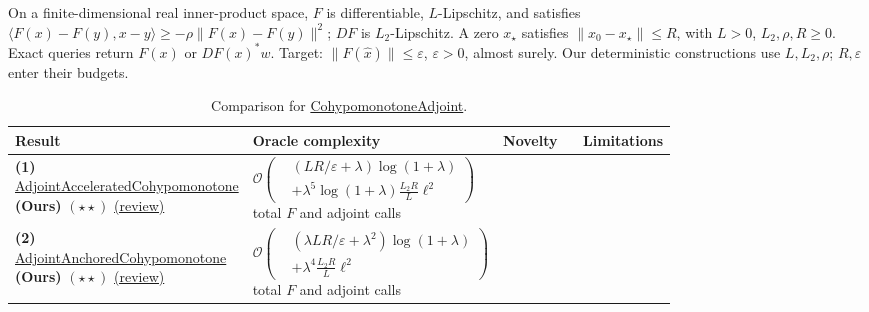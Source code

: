 \begin{table}[tp]
\centering
\caption{Comparison for \href{https://github.com/k3nfalt/longtails/blob/main/LongTails/Setups/CohypomonotoneAdjoint.lean}{CohypomonotoneAdjoint}.}\label{tab:CohypomonotoneAdjoint}
\parbox{\linewidth}{\footnotesize On a finite-dimensional real inner-product space, $F$ is differentiable, $L$-Lipschitz, and satisfies $\langle F(x)-F(y),x-y\rangle\geq-\rho\|F(x)-F(y)\|^2$; $DF$ is $L_2$-Lipschitz. A zero $x_\star$ satisfies $\|x_0-x_\star\|\leq R$, with $L>0$, $L_2,\rho,R\geq0$. Exact queries return $F(x)$ or $DF(x)^*w$. Target: $\|F(\widehat x)\|\leq\varepsilon$, $\varepsilon>0$, almost surely. Our deterministic constructions use $L,L_2,\rho$; $R,\varepsilon$ enter their budgets.}\par\smallskip
\begin{threeparttable}
\footnotesize
\setlength{\tabcolsep}{4pt}\renewcommand{\arraystretch}{1.25}
\begin{tabularx}{\linewidth}{@{}>{\raggedright\arraybackslash}p{0.20\linewidth}>{\raggedright\arraybackslash}p{0.32\linewidth}>{\raggedright\arraybackslash}p{0.25\linewidth}>{\raggedright\arraybackslash}X@{}}
\toprule
\textbf{Result} & \textbf{Oracle complexity} & \textbf{Novelty} & \textbf{Limitations} \\
\midrule
\textbf{(1)} \href{https://github.com/k3nfalt/longtails/blob/main/LongTails/Theorems/AdjointAcceleratedCohypomonotone.lean}{Adjoint\allowbreak Accelerated\allowbreak Cohypomonotone} \textbf{(Ours)} $(\star\star)$ \href{https://github.com/k3nfalt/longtails/blob/main/scripts/reviews/AdjointAcceleratedCohypomonotone.md}{(review)} & $\displaystyle\mathcal{O}\!\left(\begin{aligned}&(LR/\varepsilon+\lambda)\log(1+\lambda)\\&+\lambda^5\log(1+\lambda)\frac{L_2R}{L}\ell^2\end{aligned}\right)$ total $F$ and adjoint calls & & \\
\midrule
\textbf{(2)} \href{https://github.com/k3nfalt/longtails/blob/main/LongTails/Theorems/AdjointAnchoredCohypomonotone.lean}{Adjoint\allowbreak Anchored\allowbreak Cohypomonotone} \textbf{(Ours)} $(\star\star)$ \href{https://github.com/k3nfalt/longtails/blob/main/scripts/reviews/AdjointAnchoredCohypomonotone.md}{(review)} & $\displaystyle\mathcal{O}\!\left(\begin{aligned}&(\lambda LR/\varepsilon+\lambda^2)\log(1+\lambda)\\&+\lambda^4\frac{L_2R}{L}\ell^2\end{aligned}\right)$ total $F$ and adjoint calls & & \\

\end{tabularx}
\end{threeparttable}
\end{table}
